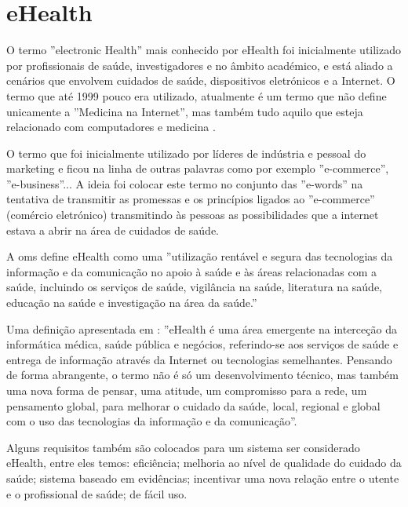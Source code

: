 \section{eHealth}
O termo ''electronic Health'' mais conhecido por eHealth foi inicialmente utilizado por profissionais de sa\'ude, investigadores e no \^ambito acad\'emico, e est\'a aliado a cen\'arios que envolvem cuidados de sa\'ude, dispositivos eletr\'onicos e a Internet. O termo que at\'e 1999 pouco era utilizado, atualmente \'e um termo que n\~ao define unicamente a ''Medicina na Internet'', mas tamb\'em tudo aquilo que esteja relacionado com computadores e medicina \cite{ehealth}.
\par
O termo que foi inicialmente utilizado por l\'ideres de ind\'ustria e pessoal do marketing e ficou na linha de outras palavras como por exemplo ''e-commerce'', ''e-business''... A ideia foi colocar este termo no conjunto das ''e-words'' na tentativa de transmitir as promessas e os princ\'ipios ligados ao ''e-commerce'' (com\'ercio eletr\'onico) transmitindo \`as pessoas as possibilidades que a internet estava a abrir na \'area de cuidados de sa\'ude. 
\par A \gls{oms} define eHealth \cite{ehealth_oms} como uma ''utiliza\c c\~ao rent\'avel e segura das tecnologias da informa\c c\~ao e da comunica\c c\~ao no apoio \`a sa\'ude e \`as \'areas relacionadas com a sa\'ude, incluindo os servi\c cos de sa\'ude, vigil\^ancia na sa\'ude, literatura na sa\'ude, educa\c c\~ao na sa\'ude e investiga\c c\~ao na \'area da sa\'ude.''
\par
Uma defini\c c\~ao apresentada em \cite{ehealth}: ''eHealth \'e uma \'area emergente na interce\c c\~ao da inform\'atica m\'edica, sa\'ude p\'ublica e neg\'ocios, referindo-se aos servi\c cos de sa\'ude e entrega de informa\c c\~ao atrav\'es da Internet ou tecnologias semelhantes. Pensando de forma abrangente, o termo n\~ao \'e s\'o um desenvolvimento t\'ecnico, mas tamb\'em uma nova forma de pensar, uma atitude, um compromisso para a rede, um pensamento global, para melhorar o cuidado da sa\'ude, local, regional e global com o uso das tecnologias da informa\c c\~ao e da comunica\c c\~ao''.
\par
Alguns requisitos tamb\'em s\~ao colocados \cite{ehealth} para um sistema ser considerado eHealth, entre eles temos: efici\^encia; melhoria ao n\'ivel de qualidade do cuidado da sa\'ude; sistema baseado em evid\^encias; incentivar uma nova rela\c c\~ao entre o utente e o profissional de sa\'ude; de f\'acil uso.

